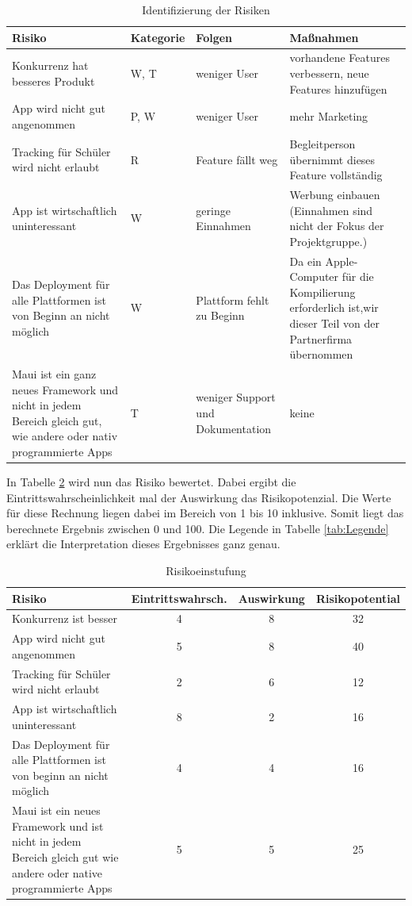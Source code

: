 \begin{table}[H]
	\centering
	\begin{tabularx}{\textwidth}{|p{5cm}|p{2cm}|p{2cm}|X|}
		\hline
		\textbf{Risiko} & \textbf{Kategorie} & \textbf{Folgen} & \textbf{Maßnahmen} \\
		\hline
		Konkurrenz hat besseres Produkt & W, T & weniger User & vorhandene Features verbessern, neue Features hinzufügen \\
		\hline
		App wird nicht gut angenommen & P, W & weniger User & mehr Marketing \\
		\hline
		Tracking für Schüler wird nicht erlaubt & R & Feature fällt weg & Begleitperson übernimmt dieses Feature vollständig \\
		\hline
		App ist wirtschaftlich uninteressant & W & geringe Einnahmen & Werbung einbauen (Einnahmen sind nicht der Fokus der Projektgruppe.) \\
		\hline
		Das Deployment für alle Plattformen ist von Beginn an nicht möglich & W & Plattform fehlt zu Beginn & Da ein Apple-Computer für die Kompilierung erforderlich ist,wir dieser Teil von der Partnerfirma übernommen \\
		\hline
		Maui ist ein ganz neues Framework und nicht in jedem Bereich gleich gut, wie andere oder nativ programmierte Apps & T & weniger Support und Dokumentation & keine  \\
		\hline
	\end{tabularx}
	\caption{Identifizierung der Risiken}
	\label{tab:Identifizierung}	
\end{table}

\newpage
In Tabelle \ref{tab:Risikoeinstufung} wird nun das Risiko bewertet. Dabei ergibt die Eintrittswahrscheinlichkeit mal der Auswirkung das Risikopotenzial. Die Werte für diese Rechnung liegen dabei im Bereich von 1 bis 10 inklusive. Somit liegt das berechnete Ergebnis zwischen 0 und 100. Die Legende in Tabelle \ref{tab:Legende} erklärt die Interpretation dieses Ergebnisses ganz genau.
\begin{table}[H]
	\centering
	\begin{tabularx}{\textwidth}{|X|c|c|c|}
		\hline
		\textbf{Risiko} & \textbf{Eintrittswahrsch.} & \textbf{Auswirkung} & \textbf{Risikopotential} \\
		\hline
		Konkurrenz ist besser & 4 & 8 & 32 \\
		\hline
		App wird nicht gut angenommen & 5 & 8 & 40 \\
		\hline
		Tracking für Schüler wird nicht erlaubt & 2 & 6 & 12 \\
		\hline
		App ist wirtschaftlich uninteressant & 8 & 2 & 16 \\
		\hline
		Das Deployment für alle Plattformen ist von beginn an nicht möglich & 4 & 4 & 16 \\
		\hline
		Maui ist ein neues Framework und ist nicht in jedem Bereich gleich gut wie andere oder native programmierte Apps & 5 & 5 & 25  \\
		\hline
 	\end{tabularx}
	\caption{Risikoeinstufung}
	\label{tab:Risikoeinstufung}	
\end{table}

